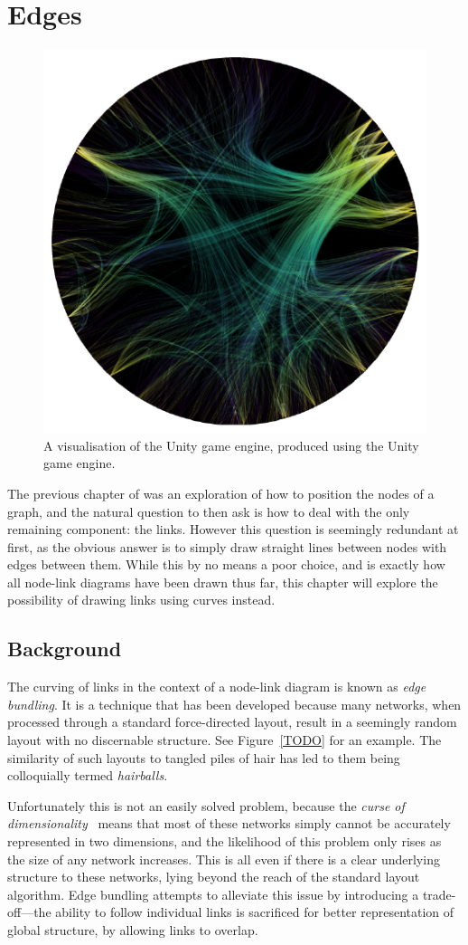 \chapter{Edges}
\begin{figure}
    \centering
    \includegraphics[width=.6\textwidth]{power/figures/metaunityplaceholder.png}
    \caption{A visualisation of the Unity game engine, produced using the Unity game engine.}
    \label{fig:metaunity}
\end{figure}
The previous chapter of was an exploration of how to position the nodes of a graph, and the natural question to then ask is how to deal with the only remaining component: the links. However this question is seemingly redundant at first, as the obvious answer is to simply draw straight lines between nodes with edges between them. While this by no means a poor choice, and is exactly how all node-link diagrams have been drawn thus far, this chapter will explore the possibility of drawing links using curves instead.

\section{Background}
The curving of links in the context of a node-link diagram is known as \textit{edge bundling}. It is a technique that has been developed because many networks, when processed through a standard force-directed layout, result in a seemingly random layout with no discernable structure. See Figure~\ref{TODO} for an example. The similarity of such layouts to tangled piles of hair has led to them being colloquially termed \textit{hairballs}.

Unfortunately this is not an easily solved problem, because the \textit{curse of dimensionality}~\cite{Friedman2001} means that most of these networks simply cannot be accurately represented in two dimensions, and the likelihood of this problem only rises as the size of any network increases. This is all even if there is a clear underlying structure to these networks, lying beyond the reach of the standard layout algorithm.
Edge bundling attempts to alleviate this issue by introducing a trade-off---the ability to follow individual links is sacrificed for better representation of global structure, by allowing links to overlap.

